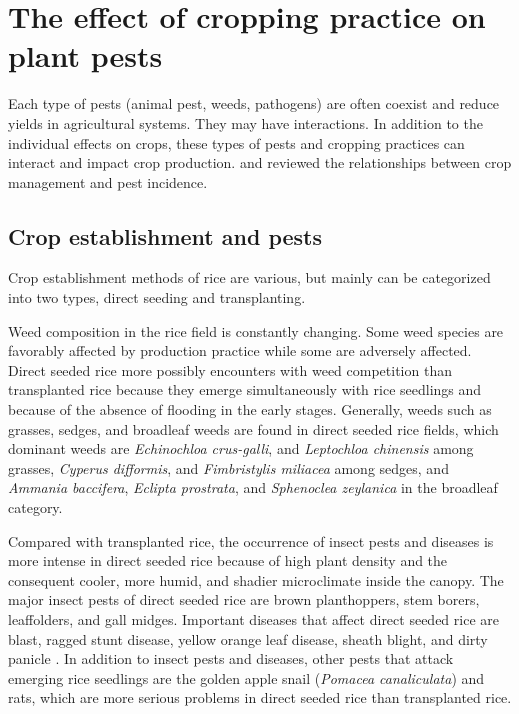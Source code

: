 \documentclass[12pt, oneside]{report}
\begin{document}
\section*{The effect of cropping practice on plant pests}

Each type of pests (animal pest, weeds, pathogens) are often coexist and reduce yields in agricultural systems. They may have interactions. In addition to the individual effects on crops, these types of pests and cropping practices can interact and impact crop production. \cite{ouricedisease, ho1994weed, cohen1998importance} and \cite{Mew:2004kh} reviewed the relationships between crop management and pest incidence. 

\subsection*{Crop establishment and pests}

Crop establishment methods of rice are various, but mainly can be categorized into two types, direct seeding and transplanting. 

Weed composition in the rice field is constantly changing. Some weed species are favorably affected by production practice while some are adversely affected. Direct seeded rice more possibly encounters with weed competition than transplanted rice because they emerge simultaneously with rice seedlings and because of the absence of flooding in the early stages. Generally, weeds such as grasses, sedges, and broadleaf weeds are found in direct seeded rice fields, which dominant weeds are \textit{Echinochloa crus-galli}, and \textit{Leptochloa chinensis} among grasses, \textit{Cyperus difformis}, and \textit{Fimbristylis miliacea} among sedges, and \textit{Ammania baccifera}, \textit{Eclipta prostrata}, and \textit{Sphenoclea zeylanica} in the broadleaf category.

Compared with transplanted rice, the occurrence of insect pests and diseases is more intense in direct seeded rice because of high plant density and the consequent cooler, more humid, and shadier microclimate inside the canopy. The major insect pests of direct seeded rice are brown planthoppers, stem borers, leaffolders, and gall midges. Important diseases that affect direct seeded rice are blast, ragged stunt disease, yellow orange leaf disease, sheath blight, and dirty panicle \citep{pongprasert1995insect}. In addition to insect pests and diseases, other pests that attack emerging rice seedlings are the golden apple snail (\textit{Pomacea canaliculata}) and rats, which are more serious problems in direct seeded rice than transplanted rice. 
\end{document}
